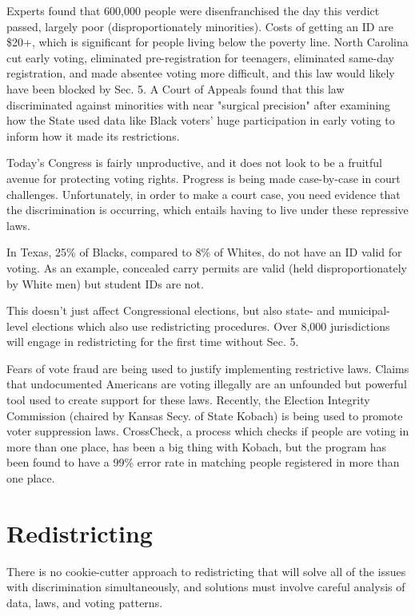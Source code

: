 Experts found that 600,000 people were disenfranchised the day this verdict passed, largely poor (disproportionately minorities).  Costs of getting an ID are \$20+, which is significant for people living below the poverty line.  North Carolina cut early voting, eliminated pre-registration for teenagers, eliminated same-day registration, and made absentee voting more difficult, and this law would likely have been blocked by Sec. 5.  A Court of Appeals found that this law discriminated against minorities with near "surgical precision" after examining how the State used data like Black voters' huge participation in early voting to inform how it made its restrictions.

Today's Congress is fairly unproductive, and it does not look to be a fruitful avenue for protecting voting rights.  Progress is being made case-by-case in court challenges.  Unfortunately, in order to make a court case, you need evidence that the discrimination is occurring, which entails having to live under these repressive laws.

In Texas, 25\% of Blacks, compared to 8\% of Whites, do not have an ID valid for voting.  As an example, concealed carry permits are valid (held disproportionately by White men) but student IDs are not.

This doesn't just affect Congressional elections, but also state- and municipal-level elections which also use redistricting procedures.  Over 8,000 jurisdictions will engage in redistricting for the first time without Sec. 5.

Fears of vote fraud are being used to justify implementing restrictive laws.  Claims that undocumented Americans are voting illegally are an unfounded but powerful tool used to create support for these laws.  Recently, the Election Integrity Commission (chaired by Kansas Secy. of State Kobach) is being used to promote voter suppression laws.  CrossCheck, a process which checks if people are voting in more than one place, has been a big thing with Kobach, but the program has been found to have a 99\% error rate in matching people registered in more than one place.


\section*{Redistricting}

There is no cookie-cutter approach to redistricting that will solve all of the issues with discrimination simultaneously, and solutions must involve careful analysis of data, laws, and voting patterns.

